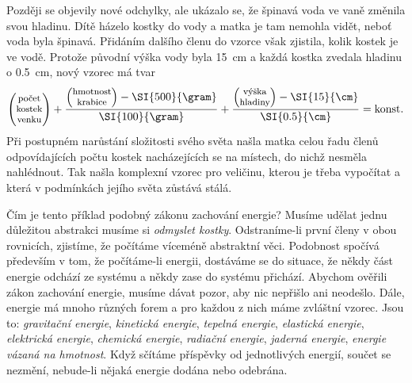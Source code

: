     Později se objevily nové odchylky, ale ukázalo se, že špinavá voda ve vaně změnila svou 
    hladinu. Dítě házelo kostky do vody a matka je tam nemohla vidět, neboť voda byla špinavá. 
    Přidáním dalšího členu do vzorce však zjistila, kolik kostek je ve vodě. Protože původní výška 
    vody byla \SI{15}{\cm} a každá kostka zvedala hladinu o \SI{0.5}{\cm}, nový vzorec má tvar
    \begin{gather*}
      \renewcommand{\arraystretch}{0.8}
        \begin{pmatrix} 
          \text{\footnotesize{počet}}   \\
          \text{\footnotesize{kostek}}  \\
          \text{\footnotesize{venku}}
        \end{pmatrix}
       +
      \frac{
            \begin{pmatrix}
              \text{\footnotesize{hmotnost}}  \\
              \text{\footnotesize{krabice}}
            \end{pmatrix}
        - \SI{500}{\gram}}{ \SI{100}{\gram}} +
      \frac{
            \begin{pmatrix}
              \text{\footnotesize{výška}}  \\
              \text{\footnotesize{hladiny}}
            \end{pmatrix}
        - \SI{15}{\cm}}{ \SI{0.5}{\cm}} = 
      \text{konst.}
    \end{gather*}
    Při postupném narůstání složitosti svého světa našla matka celou řadu členů odpovídajících 
    počtu kostek nacházejících se na místech, do nichž nesměla nahlédnout. Tak našla komplexní 
    vzorec pro veličinu, kterou je třeba vypočítat a která v podmínkách jejího světa zůstává stálá.
    
    Čím je tento příklad podobný zákonu zachování energie? Musíme udělat jednu důležitou abstrakci 
    musíme si \emph{odmyslet kostky}. Odstraníme-li první členy v obou rovnicích, zjistíme, že 
    počítáme víceméně abstraktní věci. Podobnost spočívá především v tom, že počítáme-li energii, 
    dostáváme se do situace, že někdy část energie odchází ze systému a někdy zase do systému 
    přichází. Abychom ověřili zákon zachování energie, musíme dávat pozor, aby nic nepřišlo ani 
    neodešlo. Dále, energie má mnoho různých forem a pro každou z nich máme zvláštní vzorec. Jsou 
    to: \emph{gravitační energie}, \emph{kinetická energie}, \emph{tepelná energie}, 
    \emph{elastická energie}, \emph{elektrická energie}, \emph{chemická energie}, \emph{radiační 
    energie}, \emph{jaderná energie}, \emph{energie vázaná na hmotnost}. Když sčítáme příspěvky od 
    jednotlivých energií, součet se nezmění, nebude-li nějaká energie dodána nebo odebrána.
    
